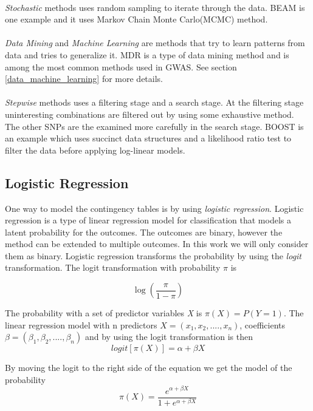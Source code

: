 \documentclass[10pt,a4paper]{report}
\begin{document}
\\
\emph{Stochastic} methods uses random sampling to iterate through the data. BEAM\cite{beam_2007} is one example and it uses Markov Chain Monte Carlo(MCMC) method.\\
\\
\emph{Data Mining} and \emph{Machine Learning} are methods that try to learn patterns from data and tries to generalize it. MDR\cite{mdr_2001} is a type of data mining method and is among the most common methods used in GWAS. See section \ref{data_machine_learning} for more details.\\
\\
\emph{Stepwise} methods uses a filtering stage and a search stage. At the filtering stage uninteresting combinations are filtered out by using some exhaustive method. The other SNPs are the examined more carefully in the search stage. BOOST\cite{boost_gene_gene} is an example which uses succinct data structures and a likelihood ratio test to filter the data before applying log-linear models.

\subsection{Logistic Regression}
One way to model the contingency tables is by using \emph{logistic regression}. Logistic regression is a type of linear regression model for classification that models a latent probability for the outcomes. The outcomes are binary, however the method can be extended to multiple outcomes. In this work we will only consider them as binary. Logistic regression transforms the probability by using the \emph{logit} transformation. The logit transformation with probability $\pi$ is \cite{agresti_categorical}

\begin{equation}\label{eq:logit}
\log(\frac{\pi}{1-\pi})
\end{equation}

The probability with a set of predictor variables \emph{X} is $\pi(X)=P(Y=1)$. The linear regression model with n predictors $X=(x_1,x_2,....,x_n)$, coefficients $\beta=(\beta_1, \beta_2,....,\beta_n)$ and by using the logit transformation is then\cite{agresti_categorical}
\begin{equation}\label{eq:logit_lr}
logit[\pi(X)]=\alpha+\beta X
\end{equation}

By moving the logit to the right side of the equation we get the model of the probability\cite{agresti_categorical}
\begin{equation}
\pi(X)=\frac{e^{\alpha+\beta X}}{1+e^{\alpha+\beta X}}
\end{equation}
\end{document}
